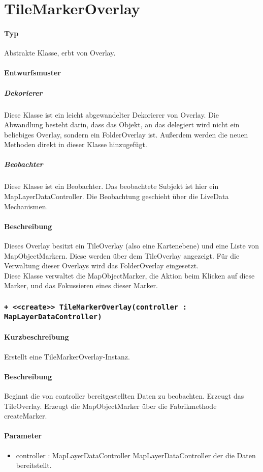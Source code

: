 \section{TileMarkerOverlay}
\paragraph*{Typ} 
Abstrakte Klasse, erbt von Overlay.
\paragraph*{Entwurfsmuster}
\subparagraph*{Dekorierer}
Diese Klasse ist ein leicht abgewandelter Dekorierer von Overlay.
Die Abwandlung besteht darin, dass das Objekt, an das delegiert wird nicht ein
beliebiges Overlay, sondern ein FolderOverlay ist. Außerdem werden die neuen 
Methoden direkt in dieser Klasse hinzugefügt.\\
\subparagraph*{Beobachter}
Diese Klasse ist ein Beobachter. Das beobachtete Subjekt ist hier ein MapLayerDataController.
Die Beobachtung geschieht über die LiveData Mechanismen.
\paragraph*{Beschreibung}
Dieses Overlay besitzt ein TileOverlay (also eine Kartenebene) und eine 
Liste von MapObjectMarkern. Diese werden über dem TileOverlay angezeigt.
Für die Verwaltung dieser Overlays wird das FolderOverlay eingesetzt.\\
Diese Klasse verwaltet die MapObjectMarker, die Aktion beim Klicken auf diese Marker, 
und das Fokussieren eines dieser Marker.

\subsubsection{\texttt{+ <<create>> TileMarkerOverlay(controller : MapLayerDataController)}}%
\paragraph*{Kurzbeschreibung}
Erstellt eine TileMarkerOverlay-Instanz.
\paragraph*{Beschreibung}
Beginnt die von controller bereitgestellten Daten zu beobachten. Erzeugt das TileOverlay.
Erzeugt die MapObjectMarker über die Fabrikmethode createMarker.
\paragraph*{Parameter}
\begin{itemize}
    \item controller : MapLayerDataController MapLayerDataController der die Daten bereitstellt.
\end{itemize}

